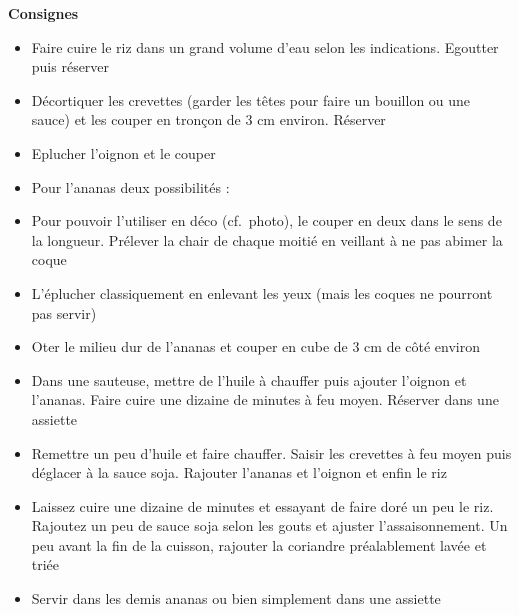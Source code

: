 \documentclass[]{book}
\providecommand{\tightlist}{%
  \setlength{\itemsep}{0pt}\setlength{\parskip}{0pt}}
\begin{document}
\textbf{Consignes}

\begin{itemize}
\tightlist
\item
  Faire cuire le riz dans un grand volume d'eau selon les indications.
  Egoutter puis réserver
\item
  Décortiquer les crevettes (garder les têtes pour faire un bouillon ou
  une sauce) et les couper en tronçon de 3 cm environ. Réserver
\item
  Eplucher l'oignon et le couper
\item
  Pour l'ananas deux possibilités :
\item
  Pour pouvoir l'utiliser en déco (cf.~photo), le couper en deux dans le
  sens de la longueur. Prélever la chair de chaque moitié en veillant à
  ne pas abimer la coque
\item
  L'éplucher classiquement en enlevant les yeux (mais les coques ne
  pourront pas servir)
\item
  Oter le milieu dur de l'ananas et couper en cube de 3 cm de côté
  environ
\item
  Dans une sauteuse, mettre de l'huile à chauffer puis ajouter l'oignon
  et l'ananas. Faire cuire une dizaine de minutes à feu moyen. Réserver
  dans une assiette
\item
  Remettre un peu d'huile et faire chauffer. Saisir les crevettes à feu
  moyen puis déglacer à la sauce soja. Rajouter l'ananas et l'oignon et
  enfin le riz
\item
  Laissez cuire une dizaine de minutes et essayant de faire doré un peu
  le riz. Rajoutez un peu de sauce soja selon les gouts et ajuster
  l'assaisonnement. Un peu avant la fin de la cuisson, rajouter la
  coriandre préalablement lavée et triée
\item
  Servir dans les demis ananas ou bien simplement dans une assiette
\end{itemize}
\end{document}
